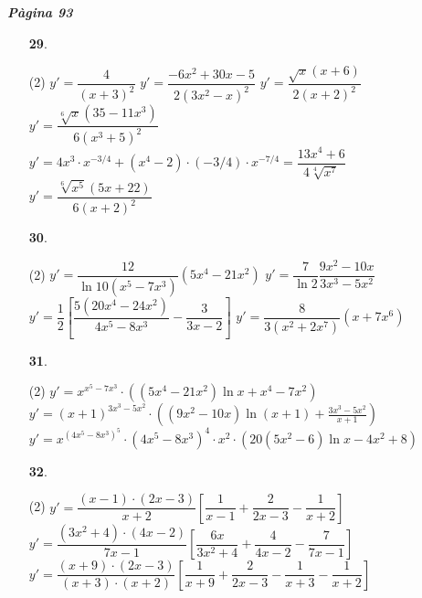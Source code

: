 \documentclass[a4paper, pdf, twoside]{book}
\begin{document}

{\textbf{\em Pàgina 93}} \hrulefill
\begin{enumerate}
\vspace{0.25cm}



 \item[\fontfamily{phv}\selectfont\color{blue}\textbf{29}. ] 
 \begin{tasks}[column-sep=1em, item-indent=1.3333em](2)
	 \task $y'=\dfrac {4}{(x+3)^2}$
	 \task* $y'=\dfrac {-6x^2+30x-5}{2(3x^2-x)^2}$
	 \task* $y'=\dfrac {\sqrt {x} (x+6)}{2(x+2)^2}$
	 \task* $y'=\dfrac {\sqrt [6]{x} (35-11x^3)}{6(x^3+5)^2}$
	 \task* $y'=4x^3\cdot x^{-3/4}+ (x^4-2)\cdot (-3/4)\cdot x^{-7/4} =\dfrac {13x^4+6}{4\sqrt [4]{x^7}}$
	 \task* $y'=\dfrac {\sqrt [6]{x^5} (5x+22)}{6(x+2)^2}$
\end{tasks}
 \end{enumerate}
\begin{enumerate}
\vspace{0.25cm}



 \item[\fontfamily{phv}\selectfont\color{blue}\textbf{30}. ] 
 \begin{tasks}[column-sep=1em, item-indent=1.3333em](2)
	 \task $y'=\dfrac {12}{\ln 10 (x^5-7x^3)}(5x^4-21x^2)$
	 \task $y'=\dfrac {7}{\ln 2}\dfrac {9x^2-10x}{3x^3-5x^2}$
	 \task $y'=\dfrac {1}{2}\left [ \dfrac {5(20x^4-24x^2)}{4x^5-8x^3} - \dfrac {3}{3x-2} \right ]$
	 \task $y'=\dfrac {8}{3(x^2+2x^7)}(x+7x^6)$
\end{tasks}
\vspace{0.25cm}



 \item[\fontfamily{phv}\selectfont\color{blue}\textbf{31}. ] 
 \begin{tasks}[column-sep=1em, item-indent=1.3333em](2)
	 \task* $y'=x^{x^5-7x^3}\cdot \left ( (5x^4-21x^2)\ln x + x^4-7x^2 \right )$
	 \task* $y'=(x+1)^{3x^3-5x^2}\cdot \left ( (9x^2-10x) \ln (x+1) +\frac {3x^3-5x^2}{x+1} \right )$
	 \task* $y'=x^{(4x^5-8x^3)^5}\cdot (4x^5-8x^3)^4 \cdot x^2 \cdot \left ( 20(5x^2-6)\ln x - 4x^2+8 \right )$
\end{tasks}
\vspace{0.25cm}



 \item[\fontfamily{phv}\selectfont\color{blue}\textbf{32}. ] 
 \begin{tasks}[column-sep=1em, item-indent=1.3333em](2)
	 \task* $y'=\dfrac {\left (x-1\right )\cdot \left (2x-3\right )}{x+2} \left [ \dfrac {1}{x-1}+\dfrac {2}{2x-3} -\dfrac {1}{x+2}\right ]$
	 \task* $y'=\dfrac {\left (3x^{2} +4\right )\cdot \left (4x-2\right )}{7x-1}\left [ \dfrac {6x}{3x^2+4}+ \dfrac {4}{4x-2} -\dfrac {7}{7x-1} \right ]$
	 \task* $y'=\dfrac {\left (x+9\right )\cdot \left (2x-3\right )}{\left (x+3\right )\cdot \left (x+2\right )} \left [ \dfrac {1}{x+9}+\dfrac {2}{2x-3}-\dfrac {1}{x+3}-\dfrac {1}{x+2} \right ]$
\end{tasks}
 \end{enumerate}
\end{document}
